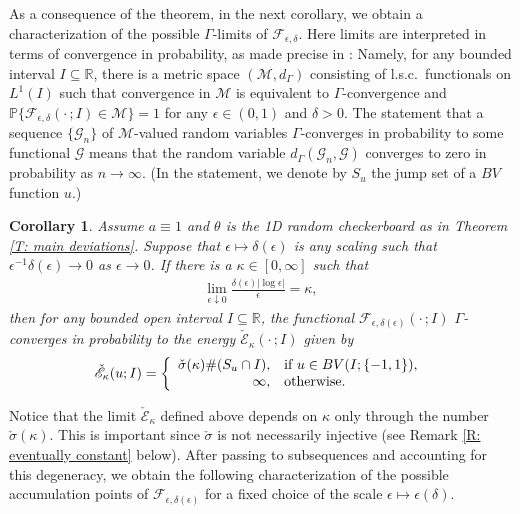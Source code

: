 \documentclass[12pt]{amsart}
\newtheorem{corollary}{Corollary}
\begin{document}
As a consequence of the theorem, in the next corollary, we obtain a characterization of the possible $\Gamma$-limits of $\mathscr{F}_{\epsilon,\delta}$.  Here limits are interpreted in terms of convergence in probability, as made precise in \cite{part1}: Namely, for any bounded interval $I \subseteq \mathbb{R}$, there is a metric space $(\mathcal{M},d_{\Gamma})$ consisting of l.s.c.\ functionals on $L^{1}(I)$ such that convergence in $\mathcal{M}$ is equivalent to $\Gamma$-convergence and $\mathbb{P} \{ \mathscr{F}_{\epsilon,\delta}(\cdot \, ; I) \in \mathcal{M} \} = 1$ for any $\epsilon \in (0,1)$ and $\delta > 0$.  The statement that a sequence $\{\mathscr{G}_{n}\}$ of $\mathcal{M}$-valued random variables $\Gamma$-converges in probability to some functional $\mathscr{G}$ means that the random variable $d_{\Gamma}(\mathscr{G}_{n},\mathscr{G})$ converges to zero in probability as $n \to \infty$.   (In the statement, we denote by $S_{u}$ the jump set of a $BV$ function $u$.)

\begin{corollary} \label{C: gamma limits} Assume $a \equiv 1$ and $\theta$ is the 1D random checkerboard as in Theorem \ref{T: main deviations}.  Suppose that $\epsilon \mapsto \delta(\epsilon)$ is any scaling such that $\epsilon^{-1} \delta(\epsilon) \to 0$ as $\epsilon \to 0$.  If there is a $\kappa \in [0,\infty]$ such that
    \begin{align} \label{E: limit corollary}
        \lim_{ \epsilon \downarrow 0 } \frac{ \delta(\epsilon) | \log \epsilon | }{ \epsilon } = \kappa , 
    \end{align}
then for any bounded open interval $I \subseteq \mathbb{R}$, the functional $\mathscr{F}_{\epsilon,\delta(\epsilon)}(\cdot \, ; I)$ $\Gamma$-converges in probability to the energy $\check{\mathscr{E}}_{\kappa}(\cdot \, ;I)$ given by
    \begin{align*}
        \check{\mathscr{E}}_{\kappa}(u;I) = \left\{ \begin{array}{r l}
            \check{\sigma}(\kappa) \# ( S_{u} \cap I ), & \text{if} \, \, u \in BV(I; \{-1,1\}), \\ \infty, & \text{otherwise.}
        \end{array} \right.
    \end{align*}
\end{corollary}

Notice that the limit $\check{\mathscr{E}}_{\kappa}$ defined above depends on $\kappa$ only through the number $\check{\sigma}(\kappa)$.  This is important since $\check{\sigma}$ is not necessarily injective (see Remark \ref{R: eventually constant} below).  After passing to subsequences and accounting for this degeneracy, we obtain the following characterization of the possible accumulation points of $\mathscr{F}_{\epsilon,\delta(\epsilon)}$ for a fixed choice of the scale $\epsilon \mapsto \epsilon(\delta)$.
\end{document}
